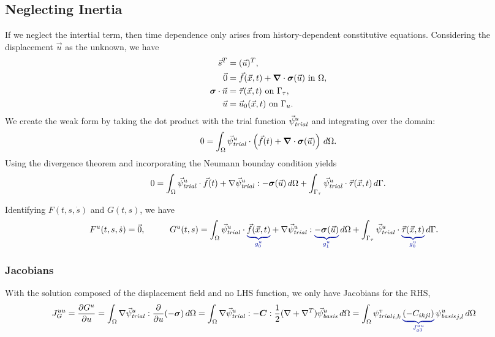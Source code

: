 \subsection{Neglecting Inertia}

If we neglect the intertial term, then time dependence only arises
from history-dependent constitutive equations. Considering the
displacement $\vec{u}$ as the unknown, we have
\begin{align}
  \vec{s}^T &= (\vec{u})^T, \\
%
  \vec{0} &= \vec{f}(\vec{x},t) + \tensor{\nabla} \cdot \tensor{\sigma}(\vec{u}) \text{ in }
\Omega, \\
  \tensor{\sigma} \cdot \vec{n} &= \vec{\tau}(\vec{x},t) \text{ on }\Gamma_\tau, \\
  \vec{u} &= \vec{u}_0(\vec{x},t) \text{ on }\Gamma_u.
\end{align}
We create the weak form by taking the dot product with the trial
function $\trialvec[u]$ and integrating over the domain:
\begin{equation}
  0 = \int_\Omega \trialvec[u] \cdot \left( \vec{f}(t) + \tensor{\nabla} \cdot \tensor{\sigma}
(\vec{u})  \right) 
\, d\Omega.
\end{equation}
Using the divergence theorem and incorporating the Neumann bounday
condition yields
\begin{equation}
  0 = \int_\Omega \trialvec[u] \cdot \vec{f}(t) + \nabla \trialvec[u] : -\tensor{\sigma}
(\vec{u}) \, d\Omega + 
\int_{\Gamma_\tau} \trialvec[u] \cdot \vec{\tau}(\vec{x},t) \, d\Gamma.
\end{equation}

Identifying $F(t,s,\dot{s})$ and $G(t,s)$, we have
\begin{alignat}{2}
  F^u(t,s,\dot{s}) &= \vec{0},
  & \qquad
  G^u(t,s) &= \int_\Omega \trialvec[u] \cdot \eqnannotate{\vec{f}(\vec{x},t)}{g_0^u} + \nabla 
\trialvec[u] : 
\eqnannotate{-\tensor{\sigma}(\vec{u})}{g_1^u} \, d\Omega + \int_{\Gamma_\tau} \trialvec[u] 
\cdot 
\eqnannotate{\vec{\tau}(\vec{x},t)}{g_0^u} \, d\Gamma.
\end{alignat}


\subsubsection{Jacobians}

With the solution composed of the displacement field and no LHS function, we only have 
Jacobians for the RHS,
\begin{align}
  J_G^{uu} &= \frac{\partial G^u}{\partial u} = \int_\Omega \nabla \trialvec[u] : 
\frac{\partial}{\partial u}(-
\tensor{\sigma}) \, d\Omega 
  = \int_\Omega \nabla \trialvec[u] : -\tensor{C} : \frac{1}{2}(\nabla + \nabla^T)\basisvec[u] 
\, d\Omega 
  = \int_\Omega \trialscalar[v]_{i,k} \, \eqnannotate{\left( -C_{ikjl} \right)}{J_{g3}^{uu}}  
\, 
\basisscalar[u]_{j,l}\, d\Omega
\end{align}

